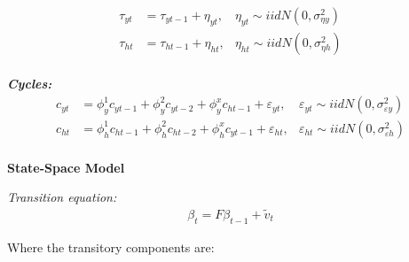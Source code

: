 \documentclass[
  12pt,
]{article}
\begin{document}
        \begin{align}
        \tau_{yt} &= \tau_{yt-1} + \eta_{yt}, &\eta_{yt} \sim iidN(0,\sigma^2_{\eta y})
        \\
        \tau_{ht} &= \tau_{ht-1} + \eta_{ht}, &\eta_{ht} \sim iidN(0,\sigma^2_{\eta h}) 
        \end{align}
        \\
        \textbf{\textit{Cycles:}}
        \begin{align}
        c_{yt} &= \phi^1_{y}c_{yt-1}  
        + \phi^2_{y}c_{yt-2}  
        + \phi^x_{y}c_{ht-1} 
        + \varepsilon_{yt},
        &\varepsilon_{yt} \sim iidN(0,\sigma^2_{\varepsilon y})        
        \\
        c_{ht} &= \phi^1_{h}c_{ht-1}  
        + \phi^2_{h}c_{ht-2}
        + \phi^x_{h}c_{yt-1}  
        + \varepsilon_{ht},
        &\varepsilon_{ht} \sim iidN(0,\sigma^2_{\varepsilon h})
        \end{align}
        \\
        
        
        \textbf{State-Space Model}
        
        \textit{Transition equation:}
        \begin{align}
        \beta_t = F\beta_{t-1} + \tilde{v}_t
        \end{align}
        
        Where the transitory components are:
        
\end{document}
